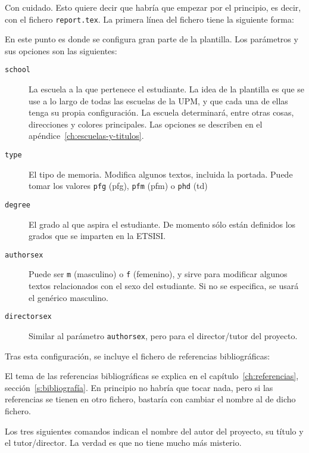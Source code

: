 Con cuidado. Esto quiere decir que habría que empezar por el principio, es decir, con el fichero \texttt{report.tex}. La primera línea del fichero tiene la siguiente forma:



En este punto es donde se configura gran parte de la plantilla. Los parámetros y sus opciones son las siguientes:

\begin{description}
    \item[\texttt{school}] La escuela a la que pertenece el estudiante. La idea de la plantilla es que se use a lo largo de todas las escuelas de la UPM, y que cada una de ellas tenga su propia configuración. La escuela determinará, entre otras cosas, direcciones y colores principales. Las opciones se describen en el apéndice~\ref{ch:escuelas-y-titulos}.
    \item[\texttt{type}] El tipo de memoria. Modifica algunos textos, incluida la portada. Puede tomar los valores \texttt{pfg} (\acrlong{pfg}), \texttt{pfm}  (\acrlong{pfm}) o \texttt{phd} (\acrlong{td})
    \item[\texttt{degree}] El grado al que aspira el estudiante. De momento sólo están definidos los grados que se imparten en la ETSISI.
    \item[\texttt{authorsex}] Puede ser \texttt{m} (masculino) o \texttt{f} (femenino), y sirve para modificar algunos textos relacionados con el sexo del estudiante. Si no se especifica, se usará el genérico masculino.
    \item[\texttt{directorsex}] Similar al parámetro \texttt{authorsex}, pero para el director/tutor del proyecto.
\end{description}

Tras esta configuración, se incluye el fichero de referencias bibliográficas:



El tema de las referencias bibliográficas se explica en el capítulo~\ref{ch:referencias}, sección~\ref{s:bibliografía}. En principio no habría que tocar nada, pero si las referencias se tienen en otro fichero, bastaría con cambiar el nombre al de dicho fichero.

Los tres siguientes comandos indican el nombre del autor del proyecto, su título y el tutor/director. La verdad es que no tiene mucho más misterio.

